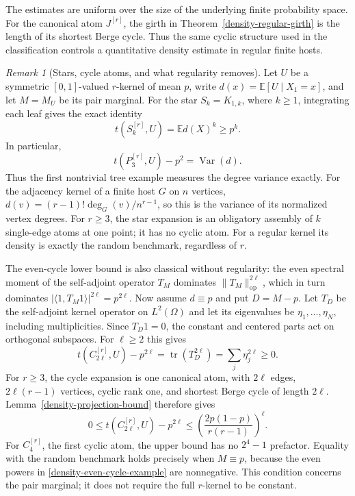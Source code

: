 \documentclass[a4paper,11pt,reqno]{amsart}
\theoremstyle{plain}
\theoremstyle{definition}
\theoremstyle{remark}
\newtheorem{remark}[theorem]{Remark}
\begin{document}
The estimates are uniform over the size of the underlying finite
probability space.  For the canonical atom $J^{[r]}$, the girth in
Theorem~\ref{density-regular-girth} is the length of its shortest
Berge cycle.  Thus the same cyclic structure used in the
classification controls a quantitative density estimate in regular
finite hosts.

\begin{remark}[Stars, cycle atoms, and what regularity removes]
\label{density-worked-examples}
Let $U$ be a symmetric $[0,1]$-valued $r$-kernel of mean $p$, write
$d(x)=\mathbb E[U\mid X_1=x]$, and let $M=M_U$ be its pair marginal.
For the star $S_k=K_{1,k}$, where $k\ge1$, integrating each leaf gives the exact identity
\[
 t(S_k^{[r]},U)=\mathbb E d(X)^k\ge p^k.
\]
In particular,
\[
 t(P_3^{[r]},U)-p^2=\operatorname{Var}(d).
\]
Thus the first nontrivial tree example measures the degree variance
exactly.  For the adjacency kernel of a finite host $G$ on $n$ vertices,
$d(v)=(r-1)!\deg_G(v)/n^{r-1}$, so this is the variance of its
normalized vertex degrees.  For $r\ge3$, the star expansion is an obligatory assembly of $k$ single-edge
atoms at one point; it has no cyclic atom.  For a regular kernel its
density is exactly the random benchmark, regardless of $r$.

The even-cycle lower bound is also classical without regularity:
the even spectral moment of the self-adjoint operator $T_M$
dominates $\|T_M\|_{\mathrm{op}}^{2\ell}$, which in turn
dominates $|\langle1,T_M1\rangle|^{2\ell}=p^{2\ell}$.
Now assume $d\equiv p$ and put $D=M-p$.  Let $T_D$ be the
self-adjoint kernel operator on $L^2(\Omega)$ and let its eigenvalues be
$\eta_1,\ldots,\eta_N$, including multiplicities.  Since $T_D1=0$,
the constant and centered parts act on orthogonal subspaces.  For
$\ell\ge2$ this gives
\begin{equation}\label{density-even-cycle-example}
 t(C_{2\ell}^{[r]},U)-p^{2\ell}
  =\operatorname{tr}(T_D^{2\ell})
  =\sum_j\eta_j^{2\ell}\ge0.
\end{equation}
For $r\ge3$, the cycle expansion is one canonical atom, with $2\ell$ edges,
$2\ell(r-1)$ vertices, cyclic rank one, and shortest Berge cycle
of length $2\ell$.  Lemma~\ref{density-projection-bound} therefore gives
\[
 0\le t(C_{2\ell}^{[r]},U)-p^{2\ell}
 \le \left(\frac{2p(1-p)}{r(r-1)}\right)^\ell.
\]
For $C_4^{[r]}$, the first cyclic atom, the upper bound has no
$2^4-1$ prefactor.  Equality with the random benchmark holds precisely
when $M\equiv p$, because the even powers in
\eqref{density-even-cycle-example} are nonnegative.  This condition
concerns the pair marginal; it does not require the full $r$-kernel
to be constant.
\end{remark}
\end{document}
